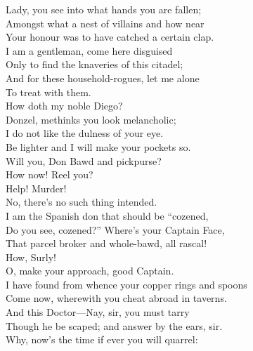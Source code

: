 \documentclass[a4paper,oneside,12pt]{memoir}
\begin{document}
\begin{drama*}
\surlyspeaks Lady, you see into what hands you are fallen;\\
Amongst what a nest of villains and how near\\
Your honour was to have catched a certain clap.\\
I am a gentleman, come here disguised\\
Only to find the knaveries of this citadel;\\
And for these household-rogues, let me alone\\
To treat with them.\\
\subtlespeaks {} How doth my noble Diego?\\
Donzel, methinks you look melancholic;\\
I do not like the dulness of your eye.\\
Be lighter and I will make your pockets so.\\
\surlyspeaks Will you, Don Bawd and pickpurse?\\
 How now! Reel you?\\
\subtlespeaks Help! Murder!\\
\surlyspeaks {} No, there's no such thing intended.\\
I am the Spanish don that should be ``cozened,\\
Do you see, cozened?'' Where's your Captain Face,\\
That parcel broker and whole-bawd, all rascal!\\
\facespeaks How, Surly!\\
\surlyspeaks {} O, make your approach, good Captain.\\
I have found from whence your copper rings and spoons\\
Come now, wherewith you cheat abroad in taverns.\\
And this Doctor---Nay, sir, you must tarry\\
Though he be scaped; and answer by the ears, sir.\\
\facespeaks Why, now's the time if ever you will quarrel:\\

\end{drama*}
\end{document}
